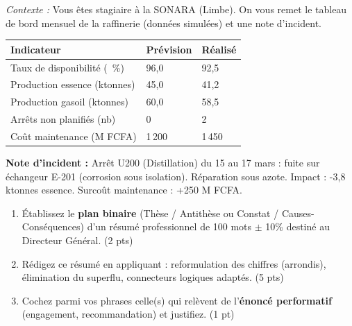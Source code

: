 \documentclass[11pt]{article}
\begin{document}
\begin{exercice}
\textit{Contexte :} Vous êtes stagiaire à la SONARA (Limbe). On vous remet le tableau de bord mensuel de la raffinerie (données simulées) et une note d'incident.

\begin{tabularx}{\linewidth}{@{}lXX@{}}
\toprule
\textbf{Indicateur} & \textbf{Prévision} & \textbf{Réalisé} \\
\midrule
Taux de disponibilité (\SI{}{\percent}) & 96,0 & 92,5 \\
Production essence (ktonnes) & 45,0 & 41,2 \\
Production gasoil (ktonnes) & 60,0 & 58,5 \\
Arrêts non planifiés (nb) & 0 & 2 \\
Coût maintenance (M FCFA) & 1\,200 & 1\,450 \\
\bottomrule
\end{tabularx}

\textbf{Note d'incident :} \og Arrêt U200 (Distillation) du 15 au 17 mars : fuite sur échangeur E-201 (corrosion sous isolation). Réparation sous azote. Impact : -3,8 ktonnes essence. Surcoût maintenance : +250 M FCFA. \fg{}

\begin{enumerate}
    \item Établissez le \textbf{plan binaire} (Thèse / Antithèse ou Constat / Causes-Conséquences) d'un résumé professionnel de 100 mots $\pm$ 10\% destiné au Directeur Général. (2 pts)
    \item Rédigez ce résumé en appliquant : reformulation des chiffres (arrondis), élimination du superflu, connecteurs logiques adaptés. (5 pts)
    \item Cochez parmi vos phrases celle(s) qui relèvent de l'\textbf{énoncé performatif} (engagement, recommandation) et justifiez. (1 pt)
\end{enumerate}
\end{exercice}
\end{document}
